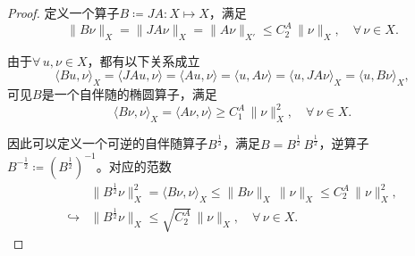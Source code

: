 \begin{proof}
定义一个算子$B \coloneqq J A : X \mapsto X$，满足
\begin{equation*}
  \big\| B \nu \big\|_{X} = \big\| J A \nu \big\|_{X} = \big\| A \nu \big\|_{X'} \le C_2^A \, \big\| \nu \big\|_X, \quad \forall \, \nu \in X.
\end{equation*}

由于$\forall \, u,\nu \in X$，都有以下关系成立
\begin{equation*}
  \langle B u, \nu \rangle_{X} = \langle J A u, \nu \rangle = \langle A u, \nu \rangle = \langle u, A \nu \rangle = \langle u, J A \nu \rangle_{X} = \langle u, B \nu \rangle_{X},
\end{equation*}
可见$B$是一个自伴随的椭圆算子，满足
\begin{equation*}
  \langle B \nu, \nu \rangle_X = \langle A \nu, \nu \rangle \ge C_1^A \, \big\| \nu \big\|_{X}^2, \quad \forall \, \nu \in X.
\end{equation*}

因此可以定义一个可逆的自伴随算子$B^{\frac{1}{2}}$，满足$B = B^{\frac{1}{2}} \, B^{\frac{1}{2}}$，逆算子$B^{- \frac{1}{2}} \coloneqq \left( B^{\frac{1}{2}} \right)^{-1}$。对应的范数
\begin{equation*}
\begin{split}
  &\big\| B^{\frac{1}{2}} \nu \big\|_{X}^2 = \langle B \nu, \nu \rangle_{X} \le \big\| B \nu \big\|_{X} \, \big\| \nu \big\|_X \le C_2^A \, \big\| \nu \big\|_X^{2}, \\
  \hookrightarrow & \big\| B^{\frac{1}{2}} \nu \big\|_{X} \le \sqrt{C_2^A} \, \big\| \nu \big\|_X, \quad \forall \, \nu \in X.
\end{split}
\end{equation*}


\end{proof}

